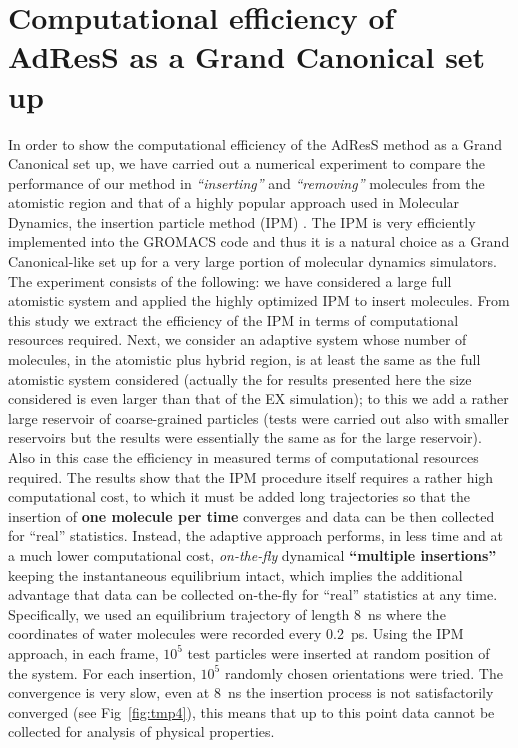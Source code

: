\documentclass[aip,jcp,a4paper,reprint,onecolumn]{revtex4-1}
\begin{document}
\section{Computational efficiency of AdResS as a Grand Canonical set up}
In order to show the computational efficiency of the AdResS method as a Grand Canonical set up, we have carried out a numerical experiment to compare the performance of our method in {\it ``inserting''} and {\it ``removing''} molecules from the atomistic region and that of a highly popular approach used in Molecular Dynamics, the insertion particle method (IPM) \cite{ipm}. The IPM is very efficiently implemented into the GROMACS code \cite{gromacs} and thus it is a natural choice as a Grand Canonical-like set up for a very large portion of molecular dynamics simulators. The experiment consists of the following: we have considered a large full atomistic system and applied the highly optimized IPM to insert molecules. From this study we extract the efficiency of the IPM in terms of computational resources required.
Next, we consider an adaptive system whose number of molecules, in the atomistic plus hybrid region, is at least the same as the full atomistic system considered (actually the for results presented here the size considered is even larger than that of the EX simulation); to this we add a rather large reservoir of coarse-grained particles (tests were carried out also with smaller reservoirs but the results were essentially the same as for the large reservoir). Also in this case the efficiency in measured terms of computational resources required.
The results show that the IPM procedure itself requires a rather high computational cost, to which it must be added long trajectories so that the insertion of {\bf one molecule per time} converges and data can be then collected for ``real'' statistics. Instead, the adaptive approach performs, in less time and at a much lower computational cost, {\it on-the-fly} dynamical {\bf ``multiple insertions''} keeping the instantaneous equilibrium intact, which implies the additional advantage that data can be collected on-the-fly for ``real'' statistics at any time.
 Specifically, we used an equilibrium trajectory of length
8~\textsf{ns} where the coordinates of water molecules were recorded every
0.2~\textsf{ps}.  Using the IPM approach, in each frame, $10^5$ test particles were inserted
at random position of the system. For each insertion, $10^5$ randomly
chosen orientations were tried. The convergence is very
slow, even at 8~\textsf{ns} the insertion process is not satisfactorily converged (see Fig~\ref{fig:tmp4}), this means that up to this point data cannot be collected for analysis of physical properties.
\end{document}
